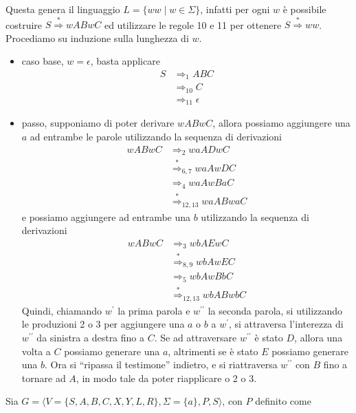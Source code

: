 \documentclass[12pt, answers]{exam}
\begin{document}
\begin{questions}
\begin{solution}
		Questa genera il linguaggio $L = \{ w w \mid w \in \Sigma \}$, infatti per ogni $w$ è possibile costruire $S \overset{*}{\Rightarrow} w A B w C$ ed utilizzare le regole 10 e 11 per ottenere $S \overset{*}{\Rightarrow} w w $.
		Procediamo su induzione sulla lunghezza di $w$.
		\begin{itemize}
			\item caso base, $w = \epsilon$, basta applicare
				\begin{align*}
					S &\Rightarrow_1 A B C \\
					  &\Rightarrow_{10} C \\
					  &\Rightarrow_{11} \epsilon 
				\end{align*}
			\item passo, supponiamo di poter derivare $w A B w C$, allora possiamo aggiungere una $a$ ad entrambe le parole utilizzando la sequenza di derivazioni
				\begin{align*} 
					w A B w C &\Rightarrow_2 w a A D w C \\
						  &\overset{*}{\Rightarrow}_{6, 7} w a A w D C \\
						  &\Rightarrow_4 w a A w B a C \\
						  &\overset{*}{\Rightarrow}_{12, 13} w a A B w a C
				\end{align*}
				e possiamo aggiungere ad entrambe una $b$ utilizzando la sequenza di derivazioni
				\begin{align*}
					w A B w C &\Rightarrow_3 w b A E w C \\
						  &\overset{*}{\Rightarrow}_{8, 9} w b A w E C \\
						  &\Rightarrow_5 w b A w B b C \\
						  &\overset{*}{\Rightarrow}_{12, 13} w b A B w b C
				\end{align*}
				Quindi, chiamando $w^\prime$ la prima parola e $w^{\prime\prime}$ la seconda parola, si utilizzando le produzioni 2 o 3 per aggiungere una $a$ o $b$ a $w^\prime$, si attraversa l'interezza di $w^{\prime\prime}$ da sinistra a destra fino a $C$.
				Se ad attraversare $w^{\prime\prime}$ è stato $D$, allora una volta a $C$ possiamo generare una $a$, altrimenti se è stato $E$ possiamo generare una $b$.
				Ora si ``ripassa il testimone'' indietro, e si riattraversa $w^{\prime\prime}$ con $B$ fino a tornare ad $A$, in modo tale da poter riapplicare o 2 o 3.
		\end{itemize}
	\end{solution}
	\question Sia $G = \langle V = \{ S , A, B, C, X, Y, L, R \}, \Sigma = \{ a \}, P, S \rangle$, con $P$ definito come

\end{questions}
\end{document}
